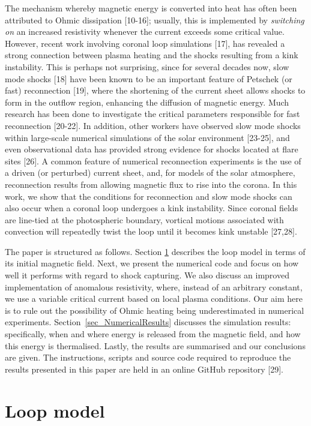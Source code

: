 \documentclass{./packages/rs/rsproca}
\begin{document}
The mechanism whereby magnetic energy is converted into heat has often been attributed to Ohmic dissipation [10-16]; usually, this is implemented by \textit{switching on} an increased resistivity whenever the current exceeds some critical value. However, recent work involving coronal loop simulations [17], has revealed a strong connection between plasma heating and the shocks resulting from a kink instability. This is perhaps not surprising, since for several decades now, slow mode shocks [18] have been known to be an important feature of Petschek (or fast) reconnection [19], where the shortening of the current sheet allows shocks to form in the outflow region, enhancing the diffusion of magnetic energy. Much research has been done to investigate the critical parameters responsible for fast reconnection [20-22]. In addition, other workers have observed slow mode shocks within large-scale numerical simulations of the solar environment [23-25], and even observational data has provided strong evidence for shocks located at flare sites [26]. A common feature of numerical reconnection experiments is the use of a driven (or perturbed) current sheet, and, for models of the solar atmosphere, reconnection results from allowing magnetic flux to rise into the corona. In this work, we show that the conditions for reconnection and slow mode shocks can also occur when a coronal loop undergoes a kink instability. Since coronal fields are line-tied at the photospheric boundary, vortical motions associated with convection will repeatedly twist the loop until it becomes kink unstable [27,28].

The paper is structured as follows. Section \ref{sec_LoopModel} describes the loop model in terms of its initial magnetic field. Next, we present the numerical code and focus on how well it performs with regard to shock capturing. We also discuss an improved implementation of anomalous resistivity, where, instead of an arbitrary constant, we use a variable critical current based on local plasma conditions. Our aim here is to rule out the possibility of Ohmic heating being underestimated in numerical experiments. \mbox{Section \ref{sec_NumericalResults}} discusses the simulation results: specifically, when and where energy is released from the magnetic field, and how this energy is thermalised. Lastly, the results are summarised and our conclusions are given. The instructions, scripts and source code required to reproduce the results presented in this paper are held in an online GitHub repository [29].

\section{Loop model}
\label{sec_LoopModel}
\end{document}
